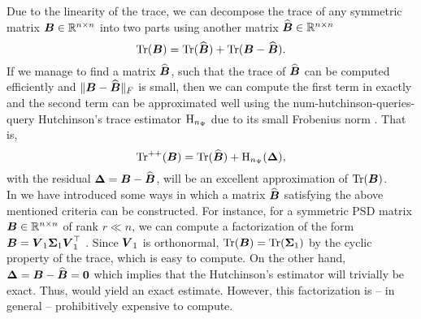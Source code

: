Due to the linearity of the trace, we can decompose the trace of any symmetric
matrix $\boldsymbol{B} \in \mathbb{R}^{n \times n}$ into two parts using another matrix
$\widehat{\boldsymbol{B}} \in \mathbb{R}^{n \times n}$
\begin{equation}
    \operatorname{Tr}(\boldsymbol{B}) = \operatorname{Tr}(\widehat{\boldsymbol{B}}) + \operatorname{Tr}(\boldsymbol{B} - \widehat{\boldsymbol{B}}).
    \label{equ:4-nystromchebyshev-trace-decomposition}
\end{equation}
If we manage to find a matrix $\widehat{\boldsymbol{B}}$, such that the trace of
$\widehat{\boldsymbol{B}}$ can be computed efficiently and
$\lVert \boldsymbol{B} - \widehat{\boldsymbol{B}} \rVert _F$ is small,
then we can compute the first term in 
exactly and the second term can be approximated well using
the \gls{num-hutchinson-queries}-query Hutchinson's
trace estimator $\operatorname{H}_{n_{\Psi}}$ 
due to its small Frobenius norm .
That is,
\begin{equation}
    \operatorname{Tr}^{++}(\boldsymbol{B}) = \operatorname{Tr}(\widehat{\boldsymbol{B}}) + \operatorname{H}_{n_{\Psi}}(\boldsymbol{\Delta}),
    \label{equ:4-nystromchebyshev-hutch-pp}
\end{equation}
with the residual $\boldsymbol{\Delta} = \boldsymbol{B} - \widehat{\boldsymbol{B}}$, will be an excellent
approximation of $\operatorname{Tr}(\boldsymbol{B})$.\\

In  we have introduced
some ways in which a matrix $\widehat{\boldsymbol{B}}$ satisfying the above mentioned
criteria can be constructed. For instance, for a symmetric \gls{PSD} matrix $\boldsymbol{B} \in \mathbb{R}^{n \times n}$
of rank $r \ll n$, we can compute a factorization of the form
$\boldsymbol{B} = \boldsymbol{V}_1 \boldsymbol{\Sigma}_1 \boldsymbol{V}_1^{\top}$ .
Since $\boldsymbol{V}_1$ is orthonormal, $\operatorname{Tr}(\boldsymbol{B}) = \operatorname{Tr}(\boldsymbol{\Sigma}_1)$ by the
cyclic property of the trace, which is easy to compute. On the other hand,
$\boldsymbol{\Delta} = \boldsymbol{B} - \widehat{\boldsymbol{B}} = \boldsymbol{0}$ which implies that the
Hutchinson's estimator will trivially be exact. Thus, 
would yield an exact estimate. However, this factorization is -- in general -- prohibitively expensive
to compute.\\

